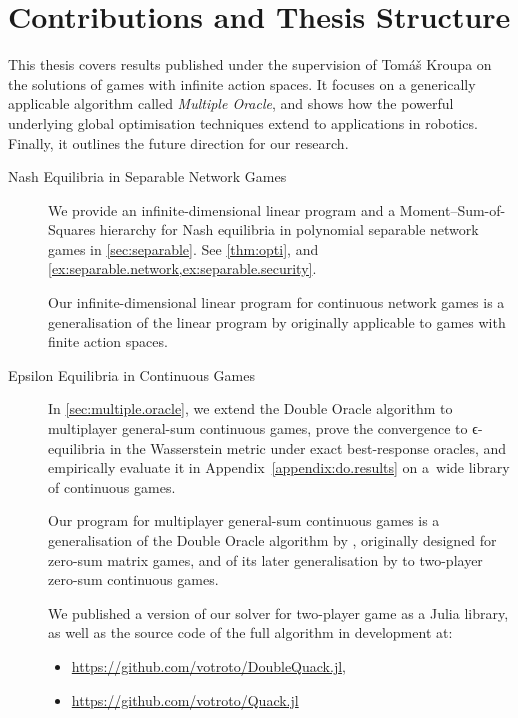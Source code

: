 \documentclass[../main.tex]{subfiles}
\begin{document}
\section{Contributions and Thesis Structure}
This thesis covers results published under the supervision of Tomáš Kroupa on the solutions of games with infinite action spaces. It focuses on a generically applicable algorithm called \emph{Multiple Oracle}, and shows how the powerful underlying global optimisation techniques extend to applications in robotics. Finally, it outlines the future direction for our research.
\begin{description}
    \item[Nash Equilibria in Separable Network Games \cite{kroupa21separablenetworkgames}] We provide an infinite-dimensional linear program and a Moment--Sum-of-Squares hierarchy for Nash equilibria in polynomial separable network games in \cref{sec:separable}. See \cref{thm:opti}, and \cref{ex:separable.network,ex:separable.security}.

    Our infinite-dimensional linear program for continuous network games is a generalisation of the linear program by \textcite{Cai16} originally applicable to games with finite action spaces.

    \item[Epsilon Equilibria in Continuous Games \cite{kroupa23multipleoracle}] In \cref{sec:multiple.oracle}, we extend the Double Oracle algorithm to multiplayer general-sum continuous games, prove the convergence to ϵ-equilibria in the Wasserstein metric under exact best-response oracles, and empirically evaluate it in Appendix~\ref{appendix:do.results} on a~wide library of continuous games.

    Our program for multiplayer general-sum continuous games is a generalisation of the Double Oracle algorithm by \textcite{McMahan03}, originally designed for zero-sum matrix games, and of its later generalisation by \textcite{adam.horčík.ea:double} to two-player zero-sum continuous games.

    We published a version of our solver for two-player game as a Julia library, as well as the source code of the full algorithm in development at:
    \begin{itemize}
        \item \url{https://github.com/votroto/DoubleQuack.jl},
        \item \url{https://github.com/votroto/Quack.jl}
    \end{itemize}


\end{description}
\end{document}
